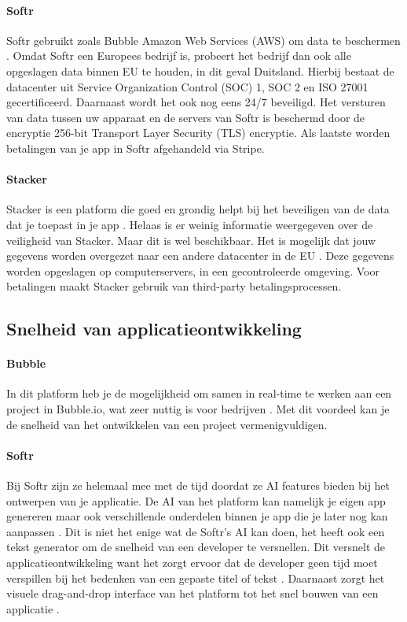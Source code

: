 \paragraph{Softr}
Softr gebruikt zoals Bubble Amazon Web Services (AWS) om data te beschermen \autocite{Softr}. Omdat Softr een Europees bedrijf is, probeert het bedrijf dan ook alle opgeslagen data binnen EU te houden, in dit geval Duitsland. Hierbij bestaat de datacenter uit Service Organization Control (SOC) 1, SOC 2 en ISO 27001 gecertificeerd. Daarnaast wordt het ook nog eens 24/7 beveiligd. Het versturen van data tussen uw apparaat en de servers van 
Softr is beschermd door de encryptie 256-bit Transport Layer Security (TLS) encryptie. Als laatste worden betalingen van je app in Softr afgehandeld via Stripe.
\paragraph{Stacker}
Stacker is een platform die goed en grondig helpt bij het beveiligen van de data dat je toepast in je app \autocite{JDN2023}.
 Helaas is er weinig informatie weergegeven over de veiligheid van Stacker. Maar dit is wel beschikbaar.
 Het is mogelijk dat jouw gegevens worden overgezet naar een andere datacenter in de EU \autocite{Stacker2023}. 
 Deze gegevens worden opgeslagen op computerservers, in een gecontroleerde omgeving. Voor betalingen maakt Stacker gebruik van third-party betalingsprocessen.
\subsection{Snelheid van applicatieontwikkeling}%
\label{subsec:snelheid-van-applicatieontwikkeling}
\paragraph{Bubble}
In dit platform heb je de mogelijkheid om samen in real-time te werken aan een project in Bubble.io, wat zeer nuttig is voor bedrijven \autocite{Bubble2024b}. 
Met dit voordeel kan je de snelheid van het ontwikkelen van een project vermenigvuldigen.
\paragraph{Softr}
Bij Softr zijn ze helemaal mee met de tijd doordat ze AI features bieden bij het ontwerpen van je applicatie. 
De AI van het platform kan namelijk je eigen app genereren maar ook verschillende onderdelen binnen je app 
die je later nog kan aanpassen \autocite{Frater2024}. Dit is niet het enige wat de Softr’s 
AI kan doen, het heeft ook een tekst generator om de snelheid van een developer te versnellen. 
Dit versnelt de applicatieontwikkeling want het zorgt ervoor dat de developer geen 
tijd moet verspillen bij het bedenken van een gepaste titel of tekst \autocite{Frater2024}. 
Daarnaast zorgt het visuele drag-and-drop interface van het platform tot het snel bouwen van een applicatie \autocite{Code2023}. 
